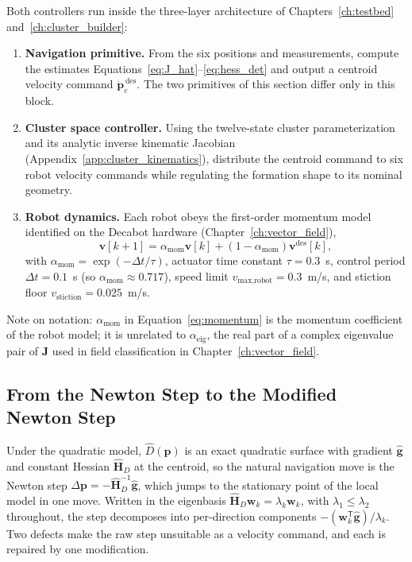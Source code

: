 \documentclass[12pt, letterpaper, oneside]{report}
\begin{document}
Both controllers run inside the three-layer architecture of
Chapters~\ref{ch:testbed} and~\ref{ch:cluster_builder}:
\begin{enumerate}
\item \textbf{Navigation primitive.} From the six positions and
measurements, compute the estimates
Equations~\eqref{eq:J_hat}--\eqref{eq:hess_det} and output a centroid
velocity command $\dot{\mathbf{p}}_c^{\,\text{des}}$. The two primitives
of this section differ only in this block.
\item \textbf{Cluster space controller.} Using the twelve-state cluster
parameterization and its analytic inverse kinematic Jacobian
(Appendix~\ref{app:cluster_kinematics}), distribute the centroid command
to six robot velocity commands while regulating the formation shape to
its nominal geometry.
\item \textbf{Robot dynamics.} Each robot obeys the first-order momentum
model identified on the Decabot hardware (Chapter~\ref{ch:vector_field}),
\begin{equation}
\mathbf{v}[k+1] = \alpha_{\text{mom}}\mathbf{v}[k] + (1-\alpha_{\text{mom}})\mathbf{v}^{\text{des}}[k],
\label{eq:momentum}
\end{equation}
with $\alpha_{\text{mom}}=\exp(-\Delta t/\tau)$, actuator time constant
$\tau=0.3$~s, control period $\Delta t=0.1$~s (so
$\alpha_{\text{mom}}\approx0.717$), speed limit
$v_{\text{max,robot}}=0.3$~m/s, and stiction floor
$v_{\text{stiction}}=0.025$~m/s.
\end{enumerate}
Note on notation: $\alpha_{\text{mom}}$ in
Equation~\eqref{eq:momentum} is the momentum coefficient of the robot
model; it is unrelated to $\alpha_{\text{eig}}$, the real part of a
complex eigenvalue pair of $\mathbf{J}$ used in field classification in
Chapter~\ref{ch:vector_field}.

\subsection{From the Newton Step to the Modified Newton Step}
\label{sec:mod_newton}

Under the quadratic model, $\hat D(\mathbf{p})$ is an exact quadratic
surface with gradient $\hat{\mathbf{g}}$ and constant Hessian
$\hat{\mathbf{H}}_D$ at the centroid, so the natural navigation move is
the Newton step
$\Delta\mathbf{p}=-\hat{\mathbf{H}}_D^{-1}\hat{\mathbf{g}}$, which jumps to
the stationary point of the local model in one move. Written in the
eigenbasis $\hat{\mathbf{H}}_D\mathbf{w}_k=\lambda_k\mathbf{w}_k$, with
$\lambda_1\leq\lambda_2$ throughout, the step decomposes into
per-direction components $-(\mathbf{w}_k^{\mathsf T}\hat{\mathbf{g}})/\lambda_k$.
Two defects make the raw step unsuitable as a velocity command, and each
is repaired by one modification.
\end{document}
